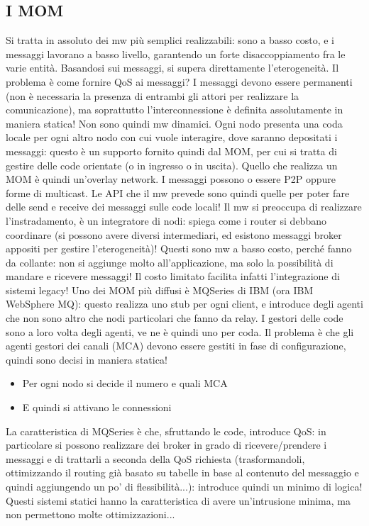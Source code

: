 \subsection{I MOM}
Si tratta in assoluto dei mw più semplici realizzabili: sono a basso costo, e i messaggi lavorano a basso livello,
garantendo un forte disaccoppiamento fra le varie entità. Basandosi sui messaggi, si supera direttamente l'eterogeneità.
Il problema è come fornire QoS ai messaggi? I messaggi devono essere permanenti (non è necessaria la presenza di
entrambi gli attori per realizzare la comunicazione), ma soprattutto l'interconnessione è definita assolutamente in
maniera statica! Non sono quindi mw dinamici.
Ogni nodo presenta una coda locale per ogni altro nodo con cui vuole interagire, dove saranno depositati i messaggi: questo è un supporto
fornito quindi dal MOM, per cui si tratta di gestire delle code orientate (o in ingresso o in uscita). Quello che
realizza un MOM è quindi un'overlay network.
I messaggi possono o essere P2P oppure forme di multicast. Le API che il mw prevede sono quindi quelle per poter fare
delle send e receive dei messaggi sulle code locali! Il mw si preoccupa di realizzare l'instradamento, è un
integratore di nodi: spiega come i router si debbano coordinare (si possono avere diversi intermediari, ed esistono
messaggi broker appositi per gestire l'eterogeneità)!
Questi sono mw a basso costo, perché fanno da collante: non si aggiunge molto all'applicazione, ma solo la possibilità
di mandare e ricevere messaggi! Il costo limitato facilita infatti l'integrazione di sistemi legacy!
Uno dei MOM più diffusi è MQSeries di IBM (ora IBM WebSphere MQ): questo realizza uno stub per ogni client, e introduce degli agenti che non
sono altro che nodi particolari che fanno da relay. I gestori delle code sono a loro volta degli agenti, ve ne è quindi
uno per coda. Il problema è che gli agenti gestori dei canali (MCA) devono essere gestiti in fase di configurazione,
quindi sono decisi in maniera statica!
\begin{itemize}
 \item Per ogni nodo si decide il numero e quali MCA
 \item E quindi si attivano le connessioni
\end{itemize}
La caratteristica di MQSeries è che, sfruttando le code, introduce QoS: in particolare si possono realizzare dei
broker in grado di ricevere/prendere i messaggi e di trattarli a seconda della QoS richiesta (trasformandoli,
ottimizzando il routing già basato su tabelle in base al contenuto del messaggio e quindi aggiungendo un po' di
flessibilità...): introduce quindi un minimo di logica! Questi sistemi statici hanno la caratteristica di avere
un'intrusione minima, ma non permettono molte ottimizzazioni...

